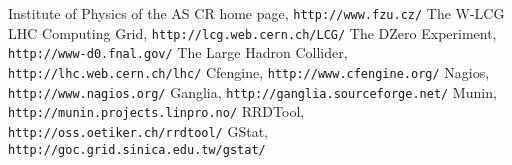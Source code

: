 \documentclass[12pt]{article}
\begin{document}
\begin{thebibliography}{9}
    Institute of Physics of the AS CR home page, {\tt http://www.fzu.cz/}
    The W-LCG LHC Computing Grid, {\tt http://lcg.web.cern.ch/LCG/}
    The DZero Experiment, {\tt http://www-d0.fnal.gov/}
    The Large Hadron Collider, {\tt http://lhc.web.cern.ch/lhc/}
    Cfengine, {\tt http://www.cfengine.org/}
    Nagios, {\tt http://www.nagios.org/}
    Ganglia, {\tt http://ganglia.sourceforge.net/}
    Munin, {\tt http://munin.projects.linpro.no/}
    RRDTool, {\tt http://oss.oetiker.ch/rrdtool/}
    GStat, {\tt http://goc.grid.sinica.edu.tw/gstat/}
\end{thebibliography}
\end{document}
